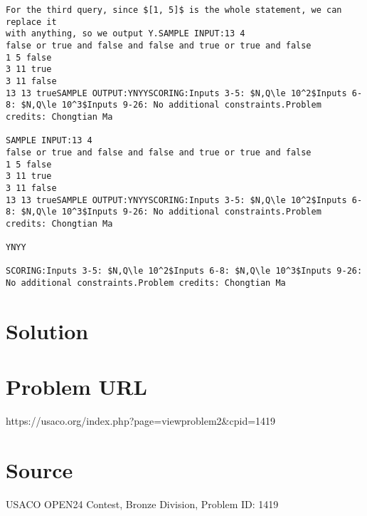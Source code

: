\documentclass[12pt]{article}
\begin{document}
\begin{verbatim}
For the third query, since $[1, 5]$ is the whole statement, we can replace it
with anything, so we output Y.SAMPLE INPUT:13 4
false or true and false and false and true or true and false
1 5 false
3 11 true
3 11 false
13 13 trueSAMPLE OUTPUT:YNYYSCORING:Inputs 3-5: $N,Q\le 10^2$Inputs 6-8: $N,Q\le 10^3$Inputs 9-26: No additional constraints.Problem credits: Chongtian Ma

SAMPLE INPUT:13 4
false or true and false and false and true or true and false
1 5 false
3 11 true
3 11 false
13 13 trueSAMPLE OUTPUT:YNYYSCORING:Inputs 3-5: $N,Q\le 10^2$Inputs 6-8: $N,Q\le 10^3$Inputs 9-26: No additional constraints.Problem credits: Chongtian Ma

YNYY

SCORING:Inputs 3-5: $N,Q\le 10^2$Inputs 6-8: $N,Q\le 10^3$Inputs 9-26: No additional constraints.Problem credits: Chongtian Ma
\end{verbatim}

\section*{Solution}


\section*{Problem URL}
https://usaco.org/index.php?page=viewproblem2&cpid=1419

\section*{Source}
USACO OPEN24 Contest, Bronze Division, Problem ID: 1419
\end{document}
